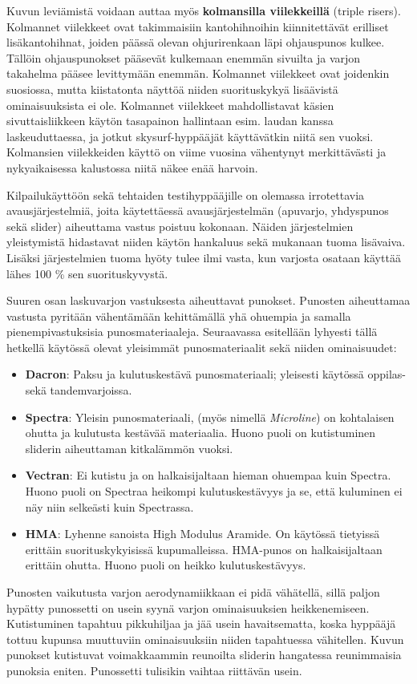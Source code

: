 Kuvun leviämistä voidaan auttaa myös \textbf{kolmansilla viilekkeillä} (triple risers). Kolmannet viilekkeet ovat takimmaisiin kantohihnoihin kiinnitettävät erilliset lisäkantohihnat, joiden päässä olevan ohjurirenkaan läpi ohjauspunos kulkee. Tällöin ohjauspunokset pääsevät kulkemaan enemmän sivuilta ja varjon takahelma pääsee levittymään enemmän. Kolmannet viilekkeet ovat joidenkin suosiossa, mutta kiistatonta näyttöä niiden suorituskykyä lisäävistä ominaisuuksista ei ole. Kolmannet viilekkeet mahdollistavat käsien sivuttaisliikkeen käytön tasapainon hallintaan esim. laudan kanssa laskeuduttaessa, ja jotkut skysurf-hyppääjät käyttävätkin niitä sen vuoksi. Kolmansien viilekkeiden käyttö on viime vuosina vähentynyt merkittävästi ja nykyaikaisessa kalustossa niitä näkee enää harvoin. 


Kilpailukäyttöön sekä tehtaiden testihyppääjille on olemassa irrotettavia avausjärjestelmiä, joita käytettäessä avausjärjestelmän (apuvarjo, yhdyspunos sekä slider) aiheuttama vastus poistuu kokonaan. Näiden järjestelmien yleistymistä hidastavat niiden käytön hankaluus sekä mukanaan tuoma lisävaiva. Lisäksi järjestelmien tuoma hyöty tulee ilmi vasta, kun varjosta osataan käyttää lähes 100 \% sen suorituskyvystä. 


Suuren osan laskuvarjon vastuksesta aiheuttavat punokset. Punosten aiheuttamaa vastusta pyritään vähentämään kehittämällä yhä ohuempia ja samalla pienempivastuksisia punosmateriaaleja. Seuraavassa esitellään lyhyesti tällä hetkellä käytössä olevat yleisimmät punosmateriaalit sekä niiden ominaisuudet: 

\begin{itemize}
\item  \textbf{Dacron}: Paksu ja kulutuskestävä punosmateriaali; yleisesti käytössä oppilas- sekä tandemvarjoissa. 
\item  \textbf{Spectra}: Yleisin punosmateriaali, (myös nimellä \textit{Microline}) on kohtalaisen ohutta ja kulutusta kestävää materiaalia. Huono puoli on kutistuminen sliderin aiheuttaman kitkalämmön vuoksi.  
\item  \textbf{Vectran}: Ei kutistu ja on halkaisijaltaan hieman ohuempaa kuin Spectra. Huono puoli on Spectraa heikompi kulutuskestävyys ja se, että kuluminen ei näy niin selkeästi kuin Spectrassa. 
\item  \textbf{HMA}: Lyhenne sanoista High Modulus Aramide. On käytössä tietyissä erittäin suorituskykyisissä kupumalleissa. HMA-punos on halkaisijaltaan erittäin ohutta. Huono puoli on heikko kulutuskestävyys.  
\end{itemize}

Punosten vaikutusta varjon aerodynamiikkaan ei pidä vähätellä, sillä paljon hypätty punossetti on usein syynä varjon ominaisuuksien heikkenemiseen. Kutistuminen tapahtuu pikkuhiljaa ja jää usein havaitsematta, koska hyppääjä tottuu kupunsa muuttuviin ominaisuuksiin niiden tapahtuessa vähitellen. Kuvun punokset kutistuvat voimakkaammin reunoilta sliderin hangatessa reunimmaisia punoksia eniten. Punossetti tulisikin vaihtaa riittävän usein. 

